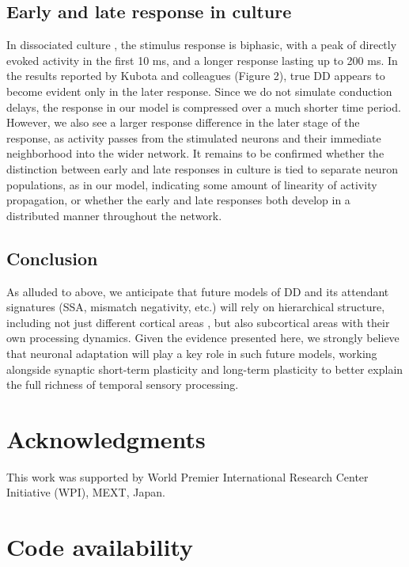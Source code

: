 \documentclass[9pt,lineno,onehalfspacing]{elife}
\begin{document}
\subsection{Early and late response in culture}

In dissociated culture \citep{Kubota2021-dx}, the stimulus response is biphasic, with a peak of directly evoked activity in the first 10 ms, and a longer response lasting up to 200 ms. In the results reported by Kubota and colleagues (Figure 2), true DD appears to become evident only in the later response. Since we do not simulate conduction delays, the response in our model is compressed over a much shorter time period. However, we also see a larger response difference in the later stage of the response, as activity passes from the stimulated neurons and their immediate neighborhood into the wider network. It remains to be confirmed whether the distinction between early and late responses in culture is tied to separate neuron populations, as in our model, indicating some amount of linearity of activity propagation, or whether the early and late responses both develop in a distributed manner throughout the network.

\subsection{Conclusion}

As alluded to above, we anticipate that future models of DD and its attendant signatures (SSA, mismatch negativity, etc.) will rely on hierarchical structure, including not just different cortical areas \citep{May2015-lt, Park2020-oa}, but also subcortical areas with their own processing dynamics. Given the evidence presented here, we strongly believe that neuronal adaptation will play a key role in such future models, working alongside synaptic short-term plasticity \citep{Yarden2017-eh} and long-term plasticity \citep{Hertag2020-kc} to better explain the full richness of temporal sensory processing.

\section{Acknowledgments}

This work was supported by World Premier International Research Center Initiative (WPI), MEXT, Japan.

\section{Code availability}
\end{document}
